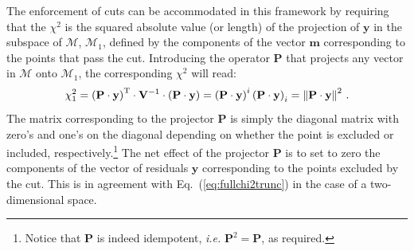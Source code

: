 \documentclass[10pt,a4paper]{article}
\begin{document}
The enforcement of cuts can be accommodated in this framework by
requiring that the $\chi^2$ is the squared absolute value (or length)
of the projection of $\mathbf{y}$ in the subspace of $\mathcal{M}$,
$\mathcal{M}_{1}$, defined by the components of the vector
$\mathbf{m}$ corresponding to the points that pass the
cut. Introducing the operator $\mathbf{P}$ that projects any vector in
$\mathcal{M}$ onto $\mathcal{M}_{1}$, the corresponding $\chi^2$ will
read:
\begin{equation}
  \chi^2_{1} = \left(\mathbf{P}\cdot \mathbf{y}\right)^{\rm T}\cdot \mathbf{V}^{-1}\cdot \left(\mathbf{P}\cdot \mathbf{y}\right)=\left(\mathbf{P}\cdot \mathbf{y}\right)^i \left(\mathbf{P}\cdot \mathbf{y}\right)_i=\left\|\mathbf{P}\cdot\mathbf{y}\right\|^2\,.
\end{equation}
The matrix corresponding to the projector $\mathbf{P}$ is simply the
diagonal matrix with zero's and one's on the diagonal depending on
whether the point is excluded or included,
respectively.\footnote{Notice that $\mathbf{P}$ is indeed idempotent,
  \textit{i.e.} $\mathbf{P}^2=\mathbf{P}$, as required.} The net
effect of the projector $\mathbf{P}$ is to set to zero the components
of the vector of residuals $\mathbf{y}$ corresponding to the points
excluded by the cut. This is in agreement with
Eq.~(\ref{eq:fullchi2trunc}) in the case of a two-dimensional space.
\end{document}
